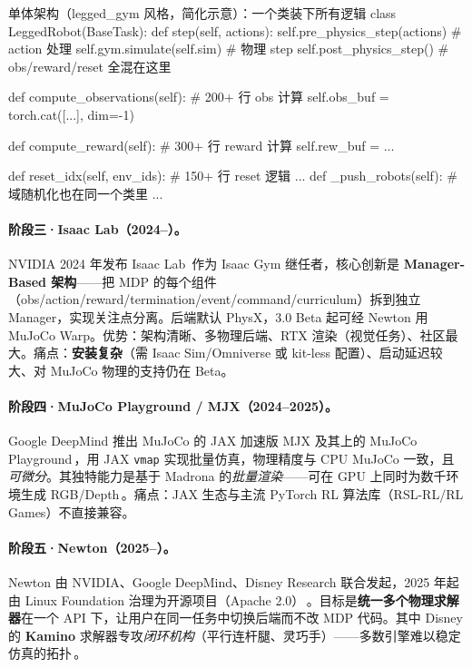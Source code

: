 \begin{codebox}[Python]{单体架构（legged\_gym 风格，简化示意）：一个类装下所有逻辑}
class LeggedRobot(BaseTask):
    def step(self, actions):
        self.pre_physics_step(actions)   # action 处理
        self.gym.simulate(self.sim)      # 物理 step
        self.post_physics_step()         # obs/reward/reset 全混在这里

    def compute_observations(self):      # 200+ 行 obs 计算
        self.obs_buf = torch.cat([...], dim=-1)

    def compute_reward(self):            # 300+ 行 reward 计算
        self.rew_buf = ...

    def reset_idx(self, env_ids):        # 150+ 行 reset 逻辑
        ...
    def _push_robots(self):              # 域随机化也在同一个类里
        ...
\end{codebox}

\paragraph{阶段三·Isaac Lab（2024--）。}NVIDIA 2024 年发布 Isaac Lab\,\cite{mittal2025isaaclab} 作为 Isaac Gym 继任者，核心创新是 \textbf{Manager-Based 架构}——把 MDP 的每个组件（obs/action/reward/termination/event/command/curriculum）拆到独立 Manager，实现关注点分离。后端默认 PhysX，3.0 Beta 起可经 Newton 用 MuJoCo Warp。优势：架构清晰、多物理后端、RTX 渲染（视觉任务）、社区最大。痛点：\textbf{安装复杂}（需 Isaac Sim/Omniverse 或 kit-less 配置）、启动延迟较大、对 MuJoCo 物理的支持仍在 Beta。

\paragraph{阶段四·MuJoCo Playground / MJX（2024--2025）。}Google DeepMind 推出 MuJoCo 的 JAX 加速版 MJX 及其上的 MuJoCo Playground\,\cite{zakka2025playground}，用 JAX \verb|vmap| 实现批量仿真，物理精度与 CPU MuJoCo 一致，且\emph{可微分}。其独特能力是基于 Madrona 的\emph{批量渲染}——可在 GPU 上同时为数千环境生成 RGB/Depth\,\cite{zakka2025playground}。痛点：JAX 生态与主流 PyTorch RL 算法库（RSL-RL/RL Games）不直接兼容。

\paragraph{阶段五·Newton（2025--）。}Newton 由 NVIDIA、Google DeepMind、Disney Research 联合发起，2025 年起由 Linux Foundation 治理为开源项目（Apache 2.0）\,\cite{newton2025}。目标是\textbf{统一多个物理求解器}在一个 API 下，让用户在同一任务中切换后端而不改 MDP 代码。其中 Disney 的 \textbf{Kamino} 求解器专攻\emph{闭环机构}（平行连杆腿、灵巧手）——多数引擎难以稳定仿真的拓扑\,\cite{newton2025}。

